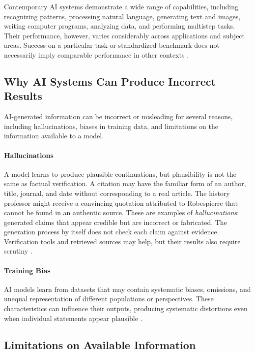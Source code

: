 \documentclass[11pt]{article}
\begin{document}
Contemporary AI systems demonstrate a wide range of
capabilities, including recognizing patterns, processing
natural language, generating text and images, writing
computer programs, analyzing data, and performing
multistep tasks. Their performance, however, varies
considerably across applications and subject areas.
Success on a particular task or standardized benchmark
does not necessarily imply comparable performance in
other contexts \citep{Bommasani2021,NIST2024GenAI}.

\subsection{Why AI Systems Can Produce Incorrect Results}

AI-generated information can be incorrect or misleading for
several reasons, including hallucinations, biases in training
data, and limitations on the information available to a model.

\paragraph{Hallucinations}
A model learns to produce plausible continuations, but plausibility
is not the same as factual verification. A citation may have the
familiar form of an author, title, journal, and date without
corresponding to a real article. The history professor might
receive a convincing quotation attributed to Robespierre that
cannot be found in an authentic source. These are examples of
\emph{hallucinations}: generated claims that appear credible but
are incorrect or fabricated. The generation process by itself
does not check each claim against evidence. Verification tools
and retrieved sources may help, but their results also require
scrutiny \citep{Ji2023Hallucination,NIST2024GenAI}.

\paragraph{Training Bias}
AI models learn from datasets that may contain
systematic biases, omissions, and unequal
representation of different populations or
perspectives. These characteristics can influence
their outputs, producing systematic distortions
even when individual statements appear plausible
\citep{Bender2021Parrots,NIST2024GenAI}.

\subsection{Limitations on Available Information}
\end{document}
